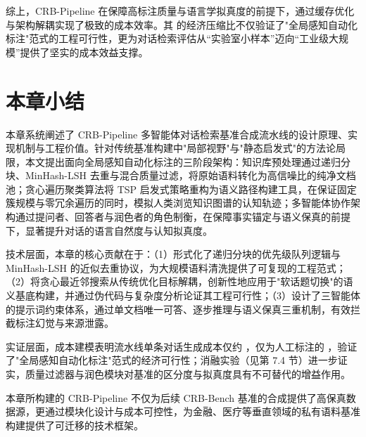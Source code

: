 综上，CRB-Pipeline 在保障高标注质量与语言学拟真度的前提下，通过缓存优化与架构解耦实现了极致的成本效率。其  的经济压缩比不仅验证了"全局感知自动化标注"范式的工程可行性，更为对话检索评估从“实验室小样本”迈向“工业级大规模”提供了坚实的成本效益支撑。



\section{本章小结}

\label{sec:chapter5_summary}



本章系统阐述了 CRB-Pipeline 多智能体对话检索基准合成流水线的设计原理、实现机制与工程价值。针对传统基准构建中"局部视野"与"静态启发式"的方法论局限，本文提出面向全局感知自动化标注的三阶段架构：知识库预处理通过递归分块、MinHash-LSH 去重与混合质量过滤，将原始语料转化为高信噪比的纯净文档池；贪心遍历聚类算法将 TSP 启发式策略重构为语义路径构建工具，在保证固定簇规模与零冗余遍历的同时，模拟人类浏览知识图谱的认知轨迹；多智能体协作架构通过提问者、回答者与润色者的角色制衡，在保障事实锚定与语义保真的前提下，显著提升对话的语言自然度与认知拟真度。



技术层面，本章的核心贡献在于：（1）形式化了递归分块的优先级队列逻辑与 MinHash-LSH 的近似去重协议，为大规模语料清洗提供了可复现的工程范式；（2）将贪心最近邻搜索从传统优化目标解耦，创新性地应用于"软话题切换"的语义基底构建，并通过伪代码与复杂度分析论证其工程可行性；（3）设计了三智能体的提示词约束体系，通过单文档唯一可答、逐步推理与语义保真三重机制，有效拦截标注幻觉与来源泄露。



实证层面，成本建模表明流水线单条对话生成成本仅约 ，仅为人工标注的 ，验证了"全局感知自动化标注"范式的经济可行性；消融实验（见第 7.4 节）进一步证实，质量过滤器与润色模块对基准的区分度与拟真度具有不可替代的增益作用。



本章所构建的 CRB-Pipeline 不仅为后续 CRB-Bench 基准的合成提供了高保真数据源，更通过模块化设计与成本可控性，为金融、医疗等垂直领域的私有语料基准构建提供了可迁移的技术框架。